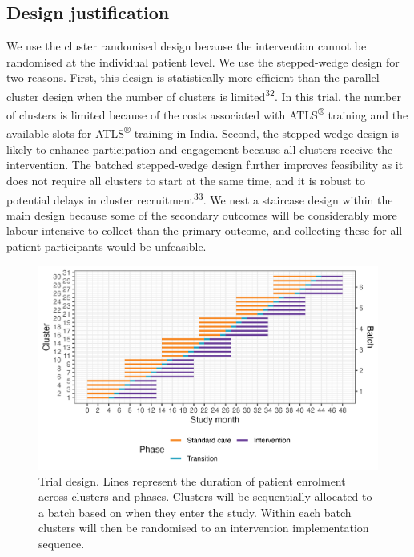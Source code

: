 \documentclass[
]{scrartcl}
\begin{document}
\hypertarget{design-justification}{%
\subsection{Design justification}\label{design-justification}}

We use the cluster randomised design because the intervention cannot be
randomised at the individual patient level. We use the stepped-wedge
design for two reasons. First, this design is statistically more
efficient than the parallel cluster design when the number of clusters
is limited\textsuperscript{32}. In this trial, the number of clusters is
limited because of the costs associated with ATLS\textsuperscript{®}
training and the available slots for ATLS\textsuperscript{®} training in
India. Second, the stepped-wedge design is likely to enhance
participation and engagement because all clusters receive the
intervention. The batched stepped-wedge design further improves
feasibility as it does not require all clusters to start at the same
time, and it is robust to potential delays in cluster
recruitment\textsuperscript{33}. We nest a staircase design within the
main design because some of the secondary outcomes will be considerably
more labour intensive to collect than the primary outcome, and
collecting these for all patient participants would be unfeasible.

\begin{figure}

{\centering \includegraphics[width=5.9in,height=\textheight]{trial-design-figure-30-clusters-5-sequences-6-batches-6-batches-overlap-4-min-standard-care-4-min-intervention-1-transition-months-0-transition-overlap.0-staircase-months.png}

}

\caption{\label{fig-trial-design}Trial design. Lines represent the
duration of patient enrolment across clusters and phases. Clusters will
be sequentially allocated to a batch based on when they enter the study.
Within each batch clusters will then be randomised to an intervention
implementation sequence.}

\end{figure}
\end{document}
